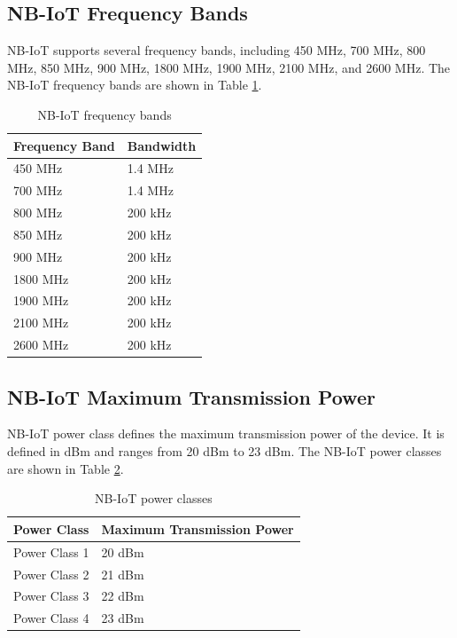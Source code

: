 \subsection{NB-IoT Frequency Bands}
NB-IoT supports several frequency bands, including 450 MHz, 700 MHz, 800 MHz, 850 MHz, 900 MHz, 1800 MHz, 1900 MHz, 2100 MHz, and 2600 MHz. The NB-IoT frequency bands are shown in Table \ref{tab:nb-iot-frequency-bands}.
\begin{table}[ht]
    \centering
    \begin{tabular}{|l|l|}
        \hline
        \textbf{Frequency Band} & \textbf{Bandwidth} \\ \hline
        450 MHz & 1.4 MHz \\ \hline
        700 MHz & 1.4 MHz \\ \hline
        800 MHz & 200 kHz \\ \hline
        850 MHz & 200 kHz \\ \hline
        900 MHz & 200 kHz \\ \hline
        1800 MHz & 200 kHz \\ \hline
        1900 MHz & 200 kHz \\ \hline
        2100 MHz & 200 kHz \\ \hline
        2600 MHz & 200 kHz \\ \hline
    \end{tabular}
    \caption{NB-IoT frequency bands \cite{nb-iot-frequency-bands}}
    \label{tab:nb-iot-frequency-bands}
\end{table}

\subsection{NB-IoT Maximum Transmission Power}
NB-IoT power class defines the maximum transmission power of the device. It is defined in dBm and ranges from 20 dBm to 23 dBm. The NB-IoT power classes are shown in Table \ref{tab:nb-iot-power-classes}.

\begin{table}[ht]
    \centering
    \begin{tabular}{|l|l|}
        \hline
        \textbf{Power Class} & \textbf{Maximum Transmission Power} \\ \hline
        Power Class 1 & 20 dBm \\ \hline
        Power Class 2 & 21 dBm \\ \hline
        Power Class 3 & 22 dBm \\ \hline
        Power Class 4 & 23 dBm \\ \hline
    \end{tabular}
    \caption{NB-IoT power classes \cite{nb-iot-power-classes}}
    \label{tab:nb-iot-power-classes}
\end{table}

